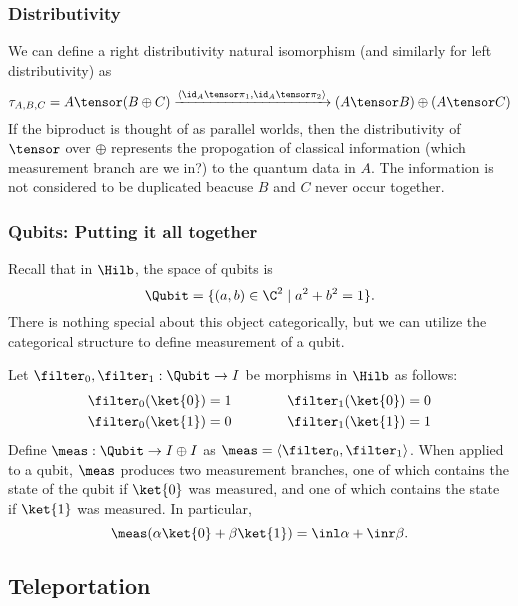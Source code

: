 \subsubsection*{Distributivity}
We can define a right distributivity natural isomorphism (and similarly for left distributivity)
as
\[
    \tau_{A,B,C} = A \tensor (B \oplus C)
    \xrightarrow{\langle \id_A \tensor \pi_1, \id_A \tensor \pi_2\rangle}
    (A \tensor B) \oplus (A \tensor C)
\]
If the biproduct is thought of as parallel worlds, then the distributivity of $\tensor$
over $\oplus$ represents the propogation of classical information (which measurement
branch are we in?) to the quantum data in $A$. The information is not considered
to be duplicated beacuse $B$ and $C$ never occur together.

\subsubsection*{Qubits: Putting it all together}

Recall that in $\Hilb$, the space of qubits is
\[ \Qubit = \{(a,b) \in \C^2 \mid a^2 + b^2=1 \}. \]
There is nothing special about this object categorically, 
but we can utilize the categorical structure to define
measurement of a qubit.

Let $\filter_0,\filter_1 : \Qubit \rightarrow I$ be morphisms in $\Hilb$ as follows:
\begin{align*} \begin{aligned}
    \filter_0(\ket{0}) &= 1 \\
    \filter_0(\ket{1}) &= 0 
\end{aligned} \qquad\qquad \begin{aligned}
    \filter_1(\ket{0}) &= 0 \\
    \filter_1(\ket{1}) &= 1
\end{aligned} \end{align*}
Define $\meas : \Qubit \rightarrow I \oplus I$ as $\meas = \langle \filter_0, \filter_1 \rangle$.
When applied to a qubit, $\meas$ produces two measurement branches, one of which 
contains the state of the qubit if $\ket{0}$ was measured, and one of which contains
the state if $\ket{1}$ was measured. In particular,
\[ \meas(\alpha\ket{0} + \beta\ket{1}) = \inl \alpha + \inr \beta. \]

\subsection{Teleportation}

